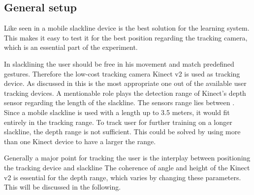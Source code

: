 \subsection{General setup } 
Like seen in \textit{} a mobile slackline device is the best solution for the learning system. This makes it easy to test it for the best position regarding the tracking camera, which is an essential part of the experiment.

In slacklining the user should be free in his movement and match predefined gestures. Therefore the low-cost tracking camera Kinect v2 is used as tracking device. As discussed in \textbf{} this is the most appropriate one out of the available user tracking devices.
A mentionable role plays the detection range of Kinect’s depth sensor regarding the length of the slackline. The sensors range lies between \textbf{}. Since a mobile slackline is used with a length up to 3.5 meters, it would fit entirely in the tracking range. To track user for further training on a longer slackline, the depth range is not sufficient. This could be solved by using more than one Kinect device to have a larger the range. 

Generally a major point for tracking the user is the interplay between positioning the tracking device and slackline The coherence of angle and height of the Kinect v2 is essential for the depth range, which varies by changing these parameters. This will be discussed in the following.

